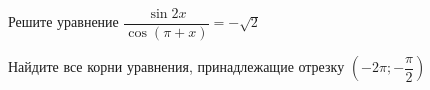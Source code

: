 \begin{ex}
	\begin{condition}
		\begin{enumcols}[label=\asbuk*)]
			\item Решите уравнение \( \dfrac{\sin 2x}{\cos (\pi + x)} = -\sqrt{2} \)
			\item Найдите все корни уравнения, принадлежащие отрезку \( \left(-2\pi;-\dfrac{\pi}{2}\right) \)
		\end{enumcols}
	\end{condition}
\end{ex}
